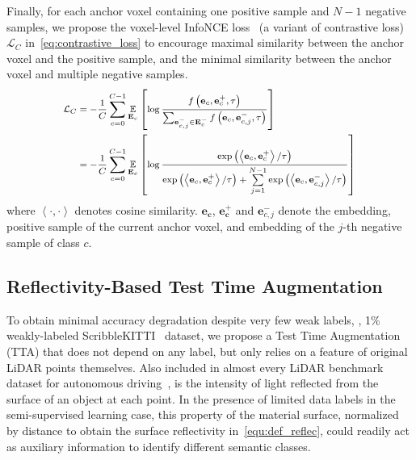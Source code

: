 \documentclass[10pt,twocolumn,letterpaper]{article}
\begin{document}
Finally, for each anchor voxel containing one positive sample and $N-1$ negative samples, we propose the voxel-level InfoNCE loss~\cite{oord2019representation} (a variant of contrastive loss) $\mathcal{L}_C$ in~\cref{eq:contrastive_loss} to encourage maximal similarity between the anchor voxel and the positive sample, and the minimal similarity between the anchor voxel and multiple negative samples.
\begin{equation}
    \label{eq:contrastive_loss}
    \footnotesize
    \begin{split}
        \mathcal{L}_C &= -\frac{1}{C} \sum_{c=0}^{C-1} \underset{\mathbf{E}_c}{\mathbb{E}}\left[\log \frac{f\left(\textbf{e}_c, \textbf{e}_c^{+}, \tau\right)}{\sum_{\textbf{e}{_{c,j}^{-}} \in \textbf{E}{_c^{-}}} f\left(\textbf{e}_c, \textbf{e}_{c,j}^{-}, \tau\right)}\right] \\
        &= -\frac{1}{C} \sum_{c=0}^{C-1} \underset{\mathbf{E}_c}{\mathbb{E}} \left[ \log \frac{\exp\left(\left\langle \textbf{e}_c, \textbf{e}_c^+ \right\rangle / \tau \right)}{\exp\left(\left\langle \textbf{e}_c, \textbf{e}_c^+ \right\rangle / \tau \right) + \sum\limits_{j=1}^{N-1}{\exp \left(\left\langle \textbf{e}_{c}, \textbf{e}_{c,j}^- \right\rangle  / \tau \right)}} \right]
    \end{split}
\end{equation}
where $\left\langle \cdot, \cdot \right\rangle$ denotes cosine similarity. $\mathbf{e_c}$, $\mathbf{e_c^+}$ and $\textbf{e}_{c, j}^{-}$ denote the embedding, positive sample of the current anchor voxel, and embedding of the $j$-th negative sample of class $c$. 










\subsection{Reflectivity-Based Test Time Augmentation}

\noindent To obtain minimal accuracy degradation despite very few weak labels, \eg, 1\% weakly-labeled ScribbleKITTI~\cite{Unal_2022_CVPR} dataset, we propose a Test Time Augmentation (TTA) that does not depend on any label, but only relies on a feature of original LiDAR points themselves. Also included in almost every LiDAR benchmark dataset for autonomous driving~\cite{Geiger2012,behley2019semantickittia,nuscenes2019,lyft2019,li2021durlara,Unal_2022_CVPR}, is the intensity of light reflected from the surface of an object at each point. In the presence of limited data labels in the semi-supervised learning case, this property of the material surface, normalized by distance to obtain the surface reflectivity in~\cref{equ:def_reflec}, could readily act as auxiliary information to identify different semantic classes. 
\end{document}
